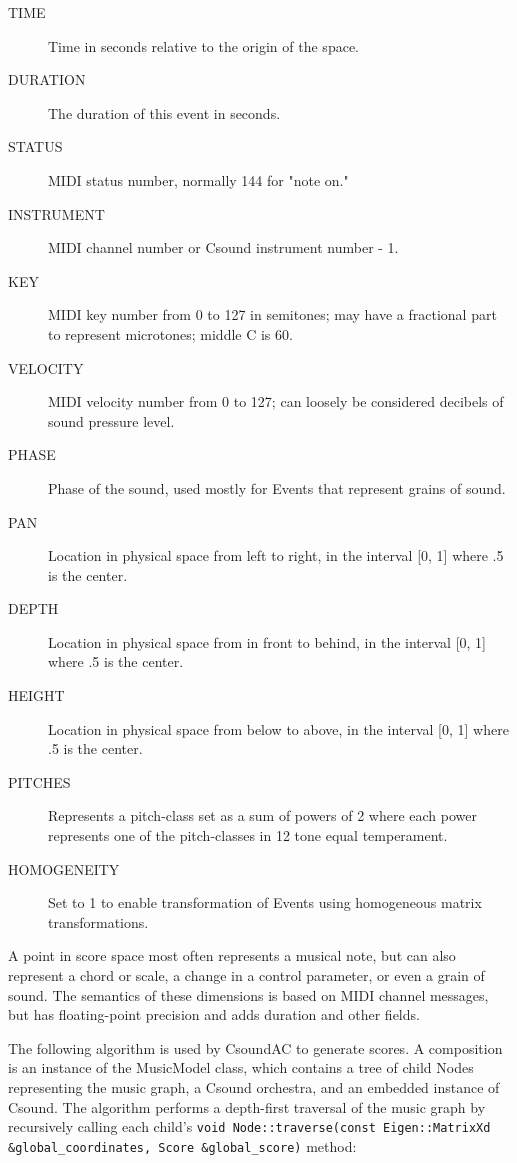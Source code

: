 \documentclass[letterpaper,10pt,DIV=12,parskip=half]{scrartcl}
\begin{document}
\begin{description}
\item[TIME] Time in seconds relative to the origin of the space.
\item[DURATION] The duration of this event in seconds.
\item[STATUS] MIDI status number, normally 144 for "note on."
\item[INSTRUMENT] MIDI channel number or Csound instrument number - 1.
\item[KEY] MIDI key number from 0 to 127 in semitones; may have a fractional part to represent microtones; middle C is 60.
\item[VELOCITY] MIDI velocity number from 0 to 127; can loosely be considered decibels of sound pressure level.
\item[PHASE] Phase of the sound, used mostly for Events that represent grains of sound.
\item[PAN] Location in physical space from left to right, in the interval [0, 1] where .5 is the center.
\item[DEPTH] Location in physical space from in front to behind, in the interval [0, 1] where .5 is the center.
\item[HEIGHT] Location in physical space from below to above, in the interval [0, 1] where .5 is the center.
\item[PITCHES] Represents a pitch-class set as a sum of powers of 2 where each power represents one of the pitch-classes in 12 tone equal temperament.
\item[HOMOGENEITY] Set to 1 to enable transformation of Events using homogeneous matrix transformations.
\end{description}

A point in score space most often represents a musical note, but can also represent a chord or scale, a change in a control parameter, or even a grain of sound. The semantics of these dimensions is based on MIDI channel messages, but has floating-point precision and adds duration and other fields.

The following algorithm is used by CsoundAC to generate scores. A composition is an instance of the MusicModel class, which contains a tree of child Nodes representing the music graph, a Csound orchestra, and an embedded instance of Csound. The algorithm performs a depth-first traversal of the music graph by recursively calling each child's \lstinline|void Node::traverse(const Eigen::MatrixXd &global_coordinates, Score &global_score)| method:
\end{document}
